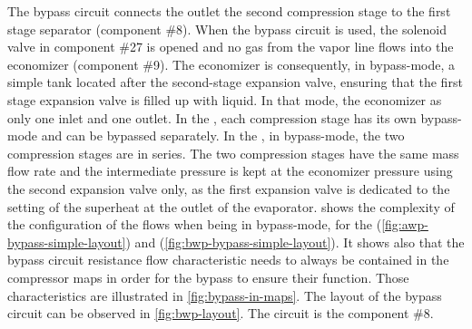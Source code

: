 The bypass circuit connects the outlet the second compression stage to
the first stage separator (component \#8). When the bypass circuit is
used, the solenoid valve in component \#27 is opened and no gas from
the vapor line flows into the economizer (component \#9). The
economizer is consequently, in bypass-mode, a simple tank located
after the second-stage expansion valve, ensuring that the first stage
expansion valve is filled up with liquid. In that mode, the economizer
as only one inlet and one outlet. In the
\AWP{}, each compression stage has its own bypass-mode and can be
bypassed separately. In the \BWP{}, in bypass-mode, the two
compression stages are in series. The two compression stages have the
same mass flow rate and the intermediate pressure is kept at the
economizer pressure using the second expansion valve
only, as the first expansion
valve is dedicated to the setting of the superheat at the outlet of
the evaporator.  shows the complexity of
the configuration of the flows when being in bypass-mode, for the
\AWP{} (\cref{fig:awp-bypass-simple-layout}) and \BWP{}
(\cref{fig:bwp-bypass-simple-layout}). It shows also that the bypass
circuit resistance flow characteristic needs to always be contained in
the compressor maps in order for the bypass to ensure their
function. Those characteristics are illustrated in
\cref{fig:bypass-in-maps}. The layout of the bypass circuit can be
observed in \cref{fig:bwp-layout}. The circuit is the component \#8.

